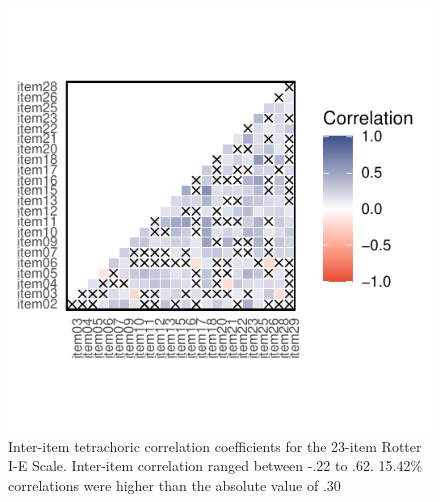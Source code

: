 \documentclass[
  english,
  man]{apa6}
\begin{document}
\begin{figure}

{\centering \includegraphics[width=1\linewidth,height=1.5\textheight]{figures/600/corplot} 

}

\caption{Inter-item tetrachoric correlation coefficients for the 23-item Rotter I-E Scale. Inter-item correlation ranged between -.22 to .62. 15.42\% correlations were higher than the absolute value of .30}\label{fig:figCor}
\end{figure}
\end{document}
